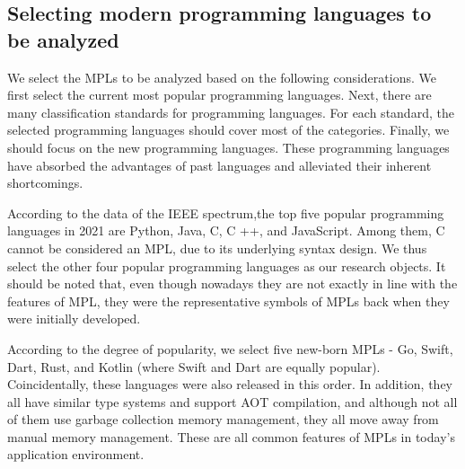 \subsection{Selecting modern programming languages to be analyzed}

We select the MPLs to be analyzed based on the following considerations.
We first select the current most popular programming languages.
Next, there are many classification standards for programming languages.
For each standard, the selected programming languages should cover most of the categories.
Finally, we should focus on the new programming languages.
These programming languages have absorbed the advantages of past languages and
alleviated their inherent shortcomings.

According to the data of the IEEE spectrum,the top five popular programming
languages in 2021 are Python, Java, C, C ++, and JavaScript\cite{IEEETopProgrammingLanguages}.
Among them, C cannot be considered an MPL, due to its underlying syntax design.
We thus select the other four popular programming languages as our research objects.
It should be noted that, even though nowadays they are not exactly in line with the
features of MPL, they were the representative symbols of MPLs back when they
were initially developed.


According to the degree of popularity, we select five new-born MPLs -
Go, Swift, Dart, Rust, and Kotlin (where Swift and Dart are equally popular).
Coincidentally, these languages were also released in this order.
In addition, they all have similar type systems and support AOT compilation,
and although not all of them use garbage collection memory management,
they all move away from manual memory management.
These are all common features of MPLs in today’s application environment.


